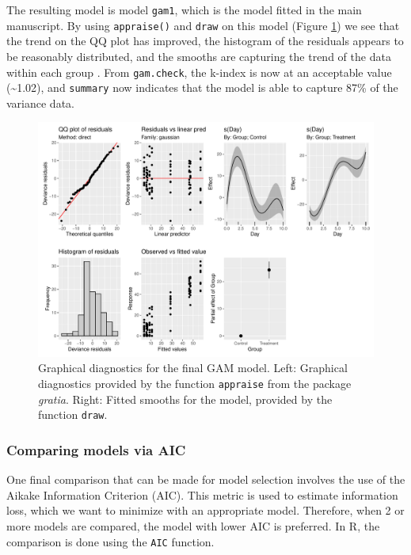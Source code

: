 \documentclass[
]{article}
\newcommand{\passthrough}[1]{#1}
\begin{document}
The resulting model is model \passthrough{\lstinline!gam1!}, which is the model fitted in the main manuscript. By using \passthrough{\lstinline!appraise()!} and \passthrough{\lstinline!draw!} on this model (Figure \ref{fig:final-GAM-diag}) we see that the trend on the QQ plot has improved, the histogram of the residuals appears to be reasonably distributed, and the smooths are capturing the trend of the data within each group . From \passthrough{\lstinline!gam.check!}, the k-index is now at an acceptable value (\textasciitilde1.02), and \passthrough{\lstinline!summary!} now indicates that the model is able to capture 87\% of the variance data.



\begin{figure}[H]

{\centering \includegraphics[width=0.75\linewidth,]{Full_document_files/figure-latex/final-GAM-diag-1} 

}

\caption{Graphical diagnostics for the final GAM model. Left: Graphical diagnostics provided by the function \passthrough{\lstinline!appraise!} from the package \emph{gratia}. Right: Fitted smooths for the model, provided by the function \passthrough{\lstinline!draw!}.}\label{fig:final-GAM-diag}
\end{figure}

\hypertarget{comparing-models-via-aic}{%
\subsubsection{Comparing models via AIC}\label{comparing-models-via-aic}}

One final comparison that can be made for model selection involves the use of the Aikake Information Criterion (AIC). This metric is used to estimate information loss, which we want to minimize with an appropriate model. Therefore, when 2 or more models are compared, the model with lower AIC is preferred. In R, the comparison is done using the \passthrough{\lstinline!AIC!} function.
\end{document}
